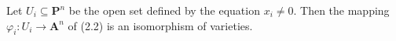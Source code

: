 Let $U_i \subseteq \mathbf{P}^n$ be the open set defined by the equation $x_i \neq 0$. Then the mapping $\varphi_i: U_i \to \mathbf{A}^n$ of (2.2) is an isomorphism of varieties.

